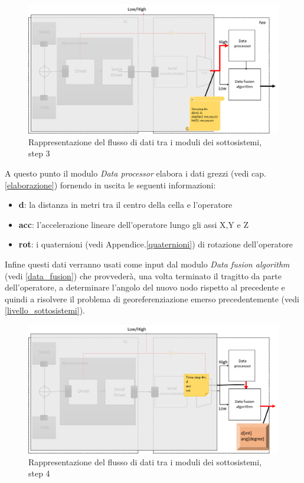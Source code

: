 \begin{figure}[H]  
 	\centering 
 	\includegraphics[scale=0.25 ]{DescrizioneDelSistema/flusso3.png}
 	\caption{Rappresentazione del flusso di dati tra i moduli dei sottosistemi, step 3}
 	\label{fig:flusso3}
 \end{figure}
\newpage
A questo punto il modulo \textit{Data processor} elabora i dati grezzi (vedi cap.\ref{elaborazione}) fornendo in uscita le seguenti informazioni:
\begin{itemize}
	\item \textbf{d}: la distanza in metri tra il centro della cella e l'operatore
	\item \textbf{acc}: l'accelerazione lineare dell'operatore lungo gli assi X,Y e Z
	\item \textbf{rot}: i quaternioni (vedi Appendice.\ref{quaternioni}) di rotazione dell'operatore
\end{itemize}
Infine questi dati verranno usati come input dal modulo \textit{Data fusion algorithm} (vedi \ref{data_fusion}) che provvederà, una volta terminato il tragitto da parte dell'operatore, a determinare l'angolo del nuovo nodo rispetto al precedente e quindi a risolvere il problema di georeferenziazione emerso precedentemente (vedi \ref{livello_sottosistemi}).
 \begin{figure}[H]  
	\centering 
	\includegraphics[scale=0.25 ]{DescrizioneDelSistema/flusso4.png}
	\caption{Rappresentazione del flusso di dati tra i moduli dei sottosistemi, step 4}
	\label{fig:flusso4}
\end{figure}